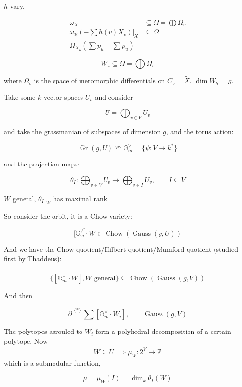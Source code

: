 $h$ vary.

$$
\begin{aligned}
\omega_X&\subseteq \Omega
=\bigoplus\Omega_v\\
\omega_{\mathfrak{X}}\left( -\sum h(v)X_{v}
\right) \Big|_{X}&\subseteq \Omega \\
\Omega_{X_{ \omega}}\left( \sum p_u-\sum p_u
\right)
\end{aligned}
$$

\medskip{}
$$
W_h\subseteq \Omega =\bigoplus\Omega_v
$$

where $\Omega_v$ is the space of meromorphic
differentials on $C_v=\tilde{X}$. $\dim
W_h=g$.

\medskip{}

Take some $k$-vector spaces $U_v$ and
consider

$$
U=\bigoplus_{v\in V} U_v
$$

and take the grassmanian of subspaces of
dimension $g$, and the torus action:

$$
\operatorname{Gr}(g,U)\curvearrowleft
\mathbb{G}^\vee_m=\{\psi:V\to k^*\}
$$

and the projection maps:

$$
\theta_I:\bigoplus_{v\in V}
U_v\longrightarrow \bigoplus_{v\in I}
U_v,\qquad I\subseteq V
$$

$W$ general, $\theta_I\Big|_{W}$ has maximal
rank.

So consider the orbit, it is a Chow variety:

$$
\overline{[\mathbb{G}^\vee_m\cdot
W}\in\operatorname{Chow}(
\operatorname{Gauss}(g,U))
$$

And we have the Chow quotient/Hilbert
quotient/Mumford quotient (studied first by
Thaddeus):

$$
\overline{\{\overline{[\mathbb{G}^\vee_m\cdot
W]},W\text{ general} \}} \subseteq
\operatorname{Chow}(\operatorname{Gauss}(g,
V))
$$

And then

$$
\partial\overset{\{*\}} =\sum
[\mathbb{G}^\vee_m\cdot W_i],\qquad
\operatorname{Gauss}(g,V)
$$

The polytopes asrouled to $W_i$ form a
polyhedral decomposition of a certain
polytope. Now
$$
\begin{aligned}
W\subseteq U\implies
\mu_W:2^V\longrightarrow \mathbb{Z}
\end{aligned}
$$
which is a submodular function,

$$
\mu=\mu_W(I)=\dim _k\theta_I(W)
$$

